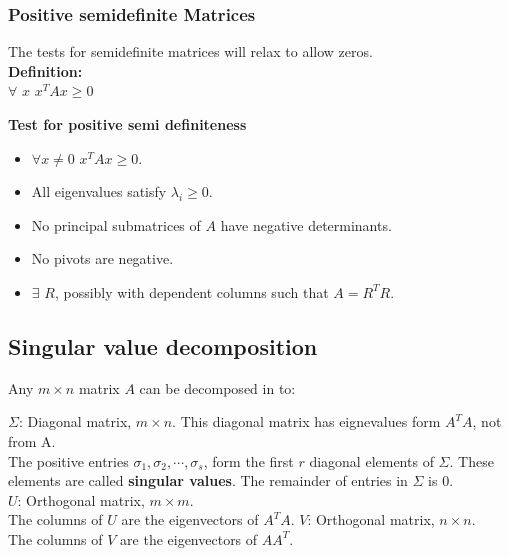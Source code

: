 \vspace{6pt}

\subsubsection{Positive semidefinite Matrices}

The tests for semidefinite matrices will relax to allow zeros.\\
\textbf{Definition:}\\
$\forall$ $x$ $x^TAx \geq 0$


\textbf{Test for positive semi definiteness}

\begin{itemize}
\item $\forall x \neq 0$ $x^TAx \geq 0$.	
\item All eigenvalues satisfy $\lambda_i \geq 0$.
\item No principal submatrices of $A$ have negative determinants.
\item No pivots are negative.
\item $\exists$ $R$, possibly with dependent columns such that $A = R^TR$.

\end{itemize}



\subsection{Singular value decomposition}
Any $m \times n$ matrix $A$ can be decomposed in to:\\

\begin{center}
\end{center}
$\Sigma$: Diagonal matrix, $m\times n$. This diagonal matrix has eignevalues form $A^TA$, not from A.\\
The positive entries $\sigma_1, \sigma_2, \cdots, \sigma_s$, form the first $r$ diagonal elements of $\Sigma$. These elements are called \textbf{singular values}. The remainder of entries in $\Sigma$ is 0.\\
\vspace{6pt}
$U$: Orthogonal matrix, $m \times m$.\\
The columns of $U$ are the eigenvectors of $A^TA$.
\vspace{6pt}
$V$: Orthogonal matrix, $n \times n$.\\
The columns of $V$ are the eigenvectors of $AA^T$.
\vspace{6pt}


